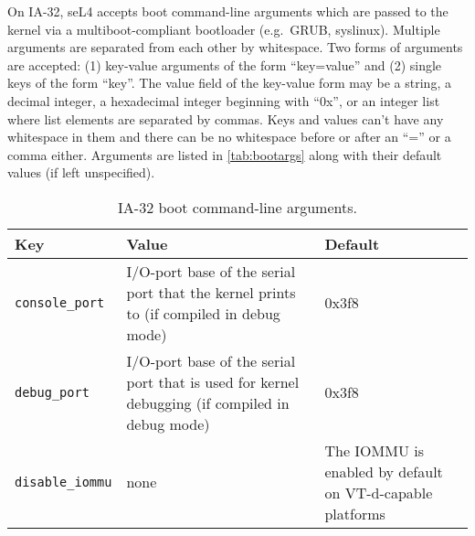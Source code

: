 On IA-32, seL4 accepts boot command-line arguments which are passed to the
kernel via a multiboot-compliant bootloader (e.g.\ GRUB, syslinux). Multiple
arguments are separated from each other by whitespace. Two forms of arguments
are accepted:
(1) key-value arguments of the form ``key=value'' and (2) single keys of the
form ``key''. The value field of the key-value form may be a string, a decimal
integer, a hexadecimal integer beginning with ``0x'', or an integer list where
list elements are separated by commas.
Keys and values can't have any whitespace in them and there can be no
whitespace before or after an ``='' or a comma either.
Arguments are listed in \autoref{tab:bootargs} along with their default values (if left unspecified).


\begin{table}[htb]
    \caption{IA-32 boot command-line arguments.}
        \begin{tabularx}{\textwidth}{lXX}
            \toprule
              Key & Value & Default \\
            \midrule
            \texttt{console\_port} &
            I/O-port base of the serial port that the kernel prints to
            (if compiled in debug mode) &
            0x3f8 \\
            \texttt{debug\_port} &
            I/O-port base of the serial port that is used for kernel debugging
            (if compiled in debug mode) &
            0x3f8 \\
            \texttt{disable\_iommu} &
            none &
            The IOMMU is enabled by default on VT-d-capable platforms \\
            \bottomrule
        \end{tabularx}
    \label{tab:bootargs}
\end{table}
\fi
